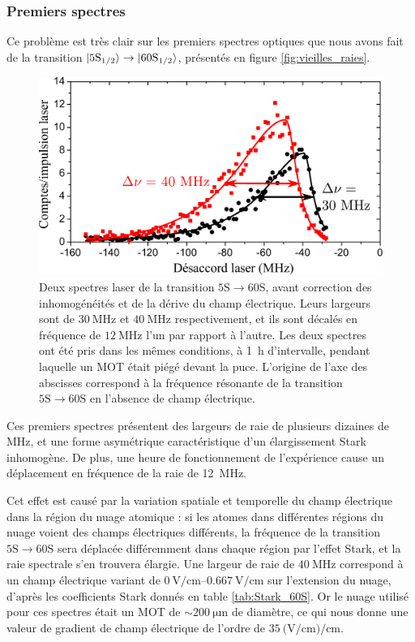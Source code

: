 \subsubsection*{Premiers spectres}
\noindent Ce problème est très clair sur les premiers spectres optiques que nous avons fait de la transition $\ket{\mathrm{5S_{1/2}}} \rightarrow \ket{\mathrm{60S_{1/2}}}$, présentés en figure \eqref{fig:vieilles_raies}.
%
\begin{figure}[!h]
\centering
\includegraphics[width=.8\linewidth]{figures/setup/rydberg/vieilles_raies}
\caption[Spectres d'excitation laser 5S-60S avant le dépôt de rubidium sur la puce]{
Deux spectres laser de la transition $5\mathrm{S}\rightarrow60\mathrm{S}$, avant correction des inhomogénéités et de la dérive du champ électrique.
Leurs largeurs sont de $\SI{30}{\MHz}$ et $\SI{40}{\MHz}$ respectivement, et ils sont décalés en fréquence de $\SI{12}{\MHz}$ l'un par rapport à l'autre.
Les deux spectres ont été pris dans les mêmes conditions, à \SI{1}{\hour} d'intervalle, pendant laquelle un MOT était piégé devant la puce.
L'origine de l'axe des abscisses correspond à la fréquence résonante de la transition $\mathrm{5S}\rightarrow\mathrm{60S}$ en l'absence de champ électrique.
}
\label{fig:vieilles_raies}
\end{figure}
%
Ces premiers spectres présentent des largeurs de raie de plusieurs dizaines de $\si{\MHz}$, et une forme asymétrique caractéristique d'un élargissement Stark inhomogène.
De plus, une heure de fonctionnement de l'expérience cause un déplacement en fréquence de la raie de \SI{12}{\MHz}.

Cet effet est causé par la variation spatiale et temporelle du champ électrique dans la région du nuage atomique :
si les atomes dans différentes régions du nuage voient des champs électriques différents, la fréquence de la transition $\mathrm{5S}\rightarrow\mathrm{60S}$ sera déplacée différemment dans chaque région par l'effet Stark, et la raie spectrale s'en trouvera élargie.
Une largeur de raie de $\SI{40}{\MHz}$ correspond à un champ électrique variant de $\SIrange{0}{0.667}{\V/\cm}$ sur l'extension du nuage, d'après les coefficients Stark donnés en table \ref{tab:Stark_60S}.
Or le nuage utilisé pour ces spectres était un MOT de $\sim \SI{200}{\um}$ de diamètre, ce qui nous donne une valeur de gradient de champ électrique de l'ordre de $\SI{35}{(\V/\cm)\per\cm}$.


